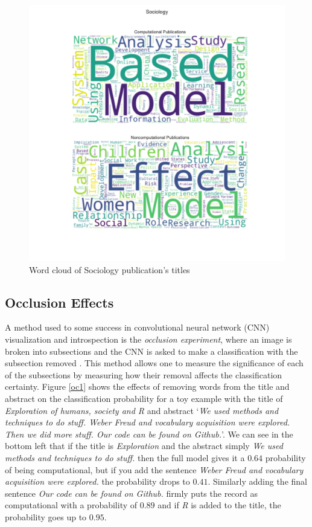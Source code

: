 \documentclass[12pt, a4paper]{article}
\begin{document}
\begin{figure}[H]
	\centering
	\includegraphics[width=\textwidth]{wc_Sociology}
	\caption{Word cloud of Sociology publication's titles}\label{wc}
\end{figure}

\subsection{Occlusion Effects}

A method used to some success in convolutional neural network (CNN) visualization and introspection is the \textit{occlusion experiment}, where an image is broken into subsections and the CNN is asked to make a classification with the subsection removed \citep{zeiler2014visualizing}. This method allows one to measure the significance of each of the subsections by measuring how their removal affects the classification certainty. Figure \ref{oc1} shows the effects of removing words from the title and abstract on the classification probability for a toy example with the title of \textit{Exploration of humans, society and R} and abstract `\textit{We used methods and techniques to do stuff. Weber Freud and vocabulary acquisition were explored. Then we did more stuff. Our code can be found on Github.}'. We can see in the bottom left that if the title is \textit{Exploration} and the abstract simply \textit{We used methods and techniques to do stuff.} then the full model gives it a $0.64$ probability of being computational, but if you add the sentence \textit{Weber Freud and vocabulary acquisition were explored.} the probability drops to $0.41$. Similarly adding the final sentence \textit{Our code can be found on Github.} firmly puts the record as computational with a probability of $0.89$ and if \textit{R} is added to the title, the probability goes up to $0.95$.
\end{document}

